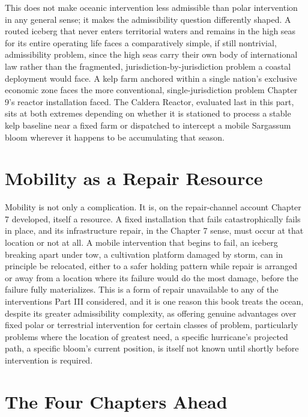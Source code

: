 \documentclass[11pt,oneside]{book}
\begin{document}
This does not make oceanic intervention less admissible than polar intervention in any general sense; it makes the admissibility question differently shaped. A routed iceberg that never enters territorial waters and remains in the high seas for its entire operating life faces a comparatively simple, if still nontrivial, admissibility problem, since the high seas carry their own body of international law rather than the fragmented, jurisdiction-by-jurisdiction problem a coastal deployment would face. A kelp farm anchored within a single nation's exclusive economic zone faces the more conventional, single-jurisdiction problem Chapter 9's reactor installation faced. The Caldera Reactor, evaluated last in this part, sits at both extremes depending on whether it is stationed to process a stable kelp baseline near a fixed farm or dispatched to intercept a mobile Sargassum bloom wherever it happens to be accumulating that season.

\section*{Mobility as a Repair Resource}

Mobility is not only a complication. It is, on the repair-channel account Chapter 7 developed, itself a resource. A fixed installation that fails catastrophically fails in place, and its infrastructure repair, in the Chapter 7 sense, must occur at that location or not at all. A mobile intervention that begins to fail, an iceberg breaking apart under tow, a cultivation platform damaged by storm, can in principle be relocated, either to a safer holding pattern while repair is arranged or away from a location where its failure would do the most damage, before the failure fully materializes. This is a form of repair unavailable to any of the interventions Part III considered, and it is one reason this book treats the ocean, despite its greater admissibility complexity, as offering genuine advantages over fixed polar or terrestrial intervention for certain classes of problem, particularly problems where the location of greatest need, a specific hurricane's projected path, a specific bloom's current position, is itself not known until shortly before intervention is required.

\section*{The Four Chapters Ahead}
\end{document}
